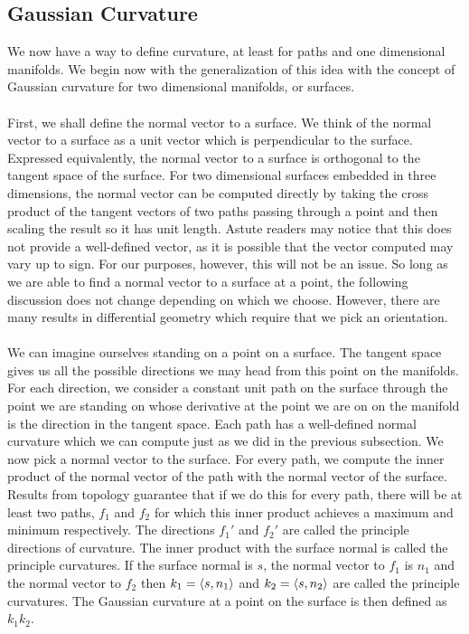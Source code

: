 \documentclass[]{article}
\newcommand\<{\ensuremath{\left\langle}}
\renewcommand\>{\ensuremath{\right\rangle}}
\theoremstyle{definition}
\theoremstyle{definition}
\begin{document}
	\subsection*{Gaussian Curvature}
	We now have a way to define curvature, at least for paths and one dimensional manifolds. We begin now with the generalization of this idea with the concept of Gaussian curvature for two dimensional manifolds, or surfaces.\\
	\\
	First, we shall define the normal vector to a surface. We think of the normal vector to a surface as a unit vector which is perpendicular to the surface. Expressed equivalently, the normal vector to a surface is orthogonal to the tangent space of the surface. For two dimensional surfaces embedded in three dimensions, the normal vector can be computed directly by taking the cross product of the tangent vectors of two paths passing through a point and then scaling the result so it has unit length. Astute readers may notice that this does not provide a well-defined vector, as it is possible that the vector computed may vary up to sign. For our purposes, however, this will not be an issue. So long as we are able to find a normal vector to a surface at a point, the following discussion does not change depending on which we choose. However, there are many results in differential geometry which require that we pick an orientation.\\
	\\
	We can imagine ourselves standing on a point on a surface. The tangent space gives us all the possible directions we may head from this point on the manifolds. For each direction, we consider a constant unit path on the surface through the point we are standing on whose derivative at the point we are on on the manifold is the direction in the tangent space. Each path has a well-defined normal curvature which we can compute just as we did in the previous subsection. We now pick a normal vector to the surface. For every path, we compute the inner product of the normal vector of the path with the normal vector of the surface. Results from topology guarantee that if we do this for every path, there will be at least two paths, $f_1$ and $f_2$ for which this inner product achieves a maximum and minimum respectively. The directions $f_1'$ and $f_2'$ are called the principle directions of curvature. The inner product with the surface normal is called the principle curvatures. If the surface normal is $s$, the normal vector to $f_1$ is $n_1$ and the normal vector to $f_2$ then $k_1 = \<s, n_1\>$ and $k_2 = \<s, n_2\>$ are called the principle curvatures. The Gaussian curvature at a point on the surface is then defined as $k_1k_2$.\\
\end{document}
